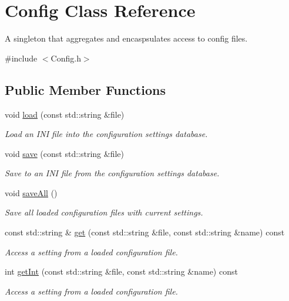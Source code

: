 \hypertarget{class_config}{}\section{Config Class Reference}
\label{class_config}


A singleton that aggregates and encaspsulates access to config files.  




{\ttfamily \#include $<$Config.\+h$>$}

\subsection*{Public Member Functions}
\begin{DoxyCompactItemize}
\item 
void \hyperlink{class_config_a8198223ee3542b0754720c28f1ca8e42}{load} (const std\+::string \&file)
\begin{DoxyCompactList}\small\item\em Load an I\+NI file into the configuration settings database. \end{DoxyCompactList}\item 
void \hyperlink{class_config_a095b729166d151267aea1e969e02a5e0}{save} (const std\+::string \&file)
\begin{DoxyCompactList}\small\item\em Save to an I\+NI file from the configuration settings database. \end{DoxyCompactList}\item 
void \hyperlink{class_config_a8159645eaab244229fb539bd7f23d365}{save\+All} ()
\begin{DoxyCompactList}\small\item\em Save all loaded configuration files with current settings. \end{DoxyCompactList}\item 
const std\+::string \& \hyperlink{class_config_a14108dcb3ce428431483cd4107fb6074}{get} (const std\+::string \&file, const std\+::string \&name) const 
\begin{DoxyCompactList}\small\item\em Access a setting from a loaded configuration file. \end{DoxyCompactList}\item 
int \hyperlink{class_config_a385fbc7610cfa7fa4fb11b11d6fad26a}{get\+Int} (const std\+::string \&file, const std\+::string \&name) const 
\begin{DoxyCompactList}\small\item\em Access a setting from a loaded configuration file. \end{DoxyCompactList}\item 

\end{DoxyCompactItemize}
